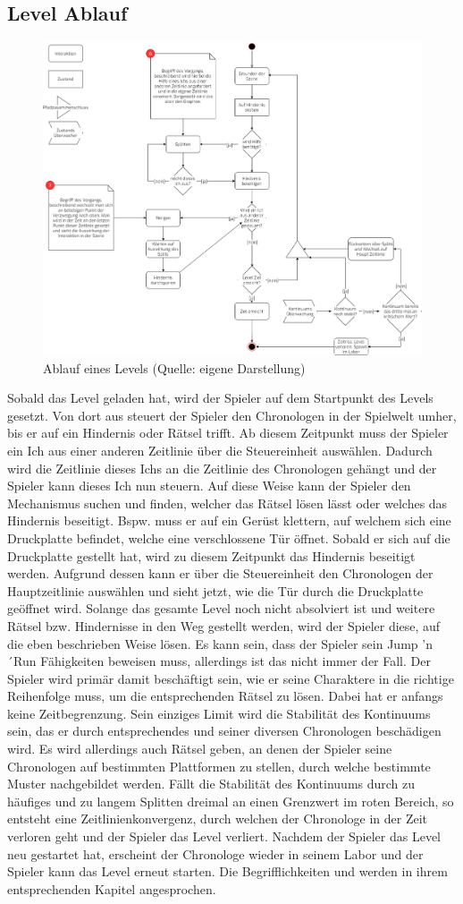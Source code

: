 \subsection{Level Ablauf}

\begin{figure}[ht]
\centering
\includegraphics[width=0.3\linewidth]{content/pictures/level_loop.jpg}
\caption{Ablauf eines Levels (Quelle: eigene Darstellung)}
\label{fig:level_loop}
\end{figure}

Sobald das Level geladen hat, wird der Spieler auf dem Startpunkt des Levels gesetzt. Von dort aus steuert der Spieler den Chronologen in der Spielwelt umher, bis er auf ein Hindernis oder Rätsel trifft. Ab diesem Zeitpunkt muss der Spieler ein Ich aus einer anderen Zeitlinie über die Steuereinheit auswählen. Dadurch wird die Zeitlinie dieses Ichs an die Zeitlinie des Chronologen gehängt und der Spieler kann dieses Ich nun steuern. Auf diese Weise kann der Spieler den Mechanismus suchen und finden, welcher das Rätsel lösen lässt oder welches das Hindernis beseitigt. Bspw. muss er auf ein Gerüst klettern, auf welchem sich eine Druckplatte befindet, welche eine verschlossene Tür öffnet. Sobald er sich auf die Druckplatte gestellt hat, wird zu diesem Zeitpunkt das Hindernis beseitigt werden. Aufgrund dessen kann er über die Steuereinheit den Chronologen der Hauptzeitlinie auswählen und sieht jetzt, wie die Tür durch die Druckplatte geöffnet wird. Solange das gesamte Level noch nicht absolviert ist und weitere Rätsel bzw. Hindernisse in den Weg gestellt werden, wird der Spieler diese, auf die eben beschrieben Weise lösen. Es kann sein, dass der Spieler sein Jump 'n´Run Fähigkeiten beweisen muss, allerdings ist das nicht immer der Fall. Der Spieler wird primär damit beschäftigt sein, wie er seine Charaktere in die richtige Reihenfolge  muss, um die entsprechenden Rätsel zu lösen. Dabei hat er anfangs keine Zeitbegrenzung. Sein einziges Limit wird die Stabilität des Kontinuums sein, das er durch entsprechendes  und  seiner diversen Chronologen beschädigen wird. Es wird allerdings auch Rätsel geben, an denen der Spieler seine Chronologen auf bestimmten Plattformen zu stellen, durch welche bestimmte Muster nachgebildet werden. 
Fällt die Stabilität des Kontinuums durch zu häufiges und zu langem Splitten dreimal an einen Grenzwert im roten Bereich, so entsteht eine Zeitlinienkonvergenz, durch welchen der Chronologe in der Zeit verloren geht und der Spieler das Level verliert. Nachdem der Spieler das Level neu gestartet hat, erscheint der Chronologe wieder in seinem Labor und der Spieler kann das Level erneut starten.
Die Begrifflichkeiten  und  werden in ihrem entsprechenden Kapitel angesprochen.

